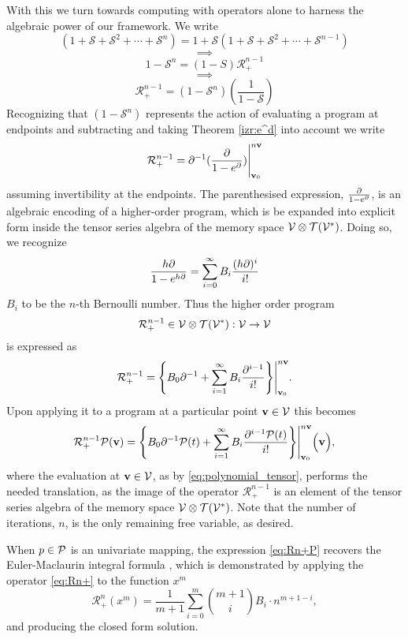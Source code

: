 With this we turn towards computing with operators alone to harness the algebraic power of our framework. We write
$$(1+\mathcal{S}+\mathcal{S}^2+\cdots+\mathcal{S}^n)=1+\mathcal{S}(1+\mathcal{S}+\mathcal{S}^2+\cdots+\mathcal{S}^{n-1})$$
   $$\implies$$
   $$1-\mathcal{S}^n=(1-S)\mathcal{R}^{n-1}_+$$
   $$\implies$$
  \begin{equation}
\mathcal{R}^{n-1}_+=(1-\mathcal{S}^n)(\frac{1}{1-\mathcal{S}})
  \end{equation}
Recognizing that $(1-\mathcal{S}^n)$ represents the action of evaluating a program at endpoints and subtracting and taking Theorem \ref{izr:e^d} into account we write
  \begin{equation}\label{eq:Rn+Basic}
    \mathcal{R}^{n-1}_+=\partial^{-1}(\frac{\partial}{1-e^\partial})\Bigg\vert_{\mathbf{v}_0}^{n\mathbf{v}}
  \end{equation}
assuming invertibility at the endpoints. The parenthesised expression, $\frac{\partial}{1-e^\partial}$, is an algebraic encoding of a higher-order program, which is be expanded into explicit form inside the tensor series algebra of the memory space $\mathcal{V}\otimes \mathcal{T}(\mathcal{V}^*)$. Doing so, we recognize
\begin{equation}
    	\frac{h\partial}{1-e^{h\partial}}=\sum\limits_{i=0}^{\infty}B_i\frac{(h\partial)^i}{i!}
    \end{equation}
$B_i$ to be the $n$-th Bernoulli number. Thus the higher order program
$$\mathcal{R}^{n-1}_+\in \mathcal{V}\otimes \mathcal{T}(\mathcal{V}^*):\mathcal{V}\to\mathcal{V}$$
is expressed as 
    \begin{equation}\label{eq:Rn+}
      \mathcal{R}^{n-1}_+=\Bigg\{B_0\partial^{-1}+\sum\limits_{i=1}^{\infty}B_i\frac{\partial^{i-1}}{i!}\Bigg\}\Bigg\vert_{\mathbf{v}_0}^{n\mathbf{v}}.
    \end{equation}
Upon applying it to a program at a particular point $\mathbf{v}\in \mathcal{V}$ this becomes
\begin{equation}\label{eq:Rn+P}
  \mathcal{R}^{n-1}_+\mathcal{P}(\mathbf{v})=\Bigg\{B_0\partial^{-1}\mathcal{P}(t)+\sum\limits_{i=1}^{\infty}B_i\frac{\partial^{i-1}\mathcal{P}(t)}{i!}\Bigg\}\Bigg\vert_{\mathbf{v}_0}^{n\mathbf{v}} \Big(\mathbf{v}\Big),
    \end{equation}
where the evaluation at $\mathbf{v}\in \mathcal{V}$, as by \eqref{eq:polynomial_tensor}, performs the needed translation, as the image of the operator $\mathcal{R}^{n-1}_+$ is an element of the tensor series algebra of the memory space $\mathcal{V}\otimes \mathcal{T}(\mathcal{V}^*)$.
Note that the number of iterations, $n$, is the only remaining free variable, as desired.
\begin{remark}
  When $p\in\mathcal{P}$ is an univariate mapping, the expression \eqref{eq:Rn+P} recovers the Euler-Maclaurin integral formula \cite{apostol1999elementary}, which is demonstrated by applying the operator \eqref{eq:Rn+} to the function $x^m$
$$\mathcal{R}^n_+(x^m)=\frac{1}{m+1}\sum_{i=0}^m{m+1\choose i}B_i\cdot n^{m+1-i},$$
and producing the closed form solution.
\end{remark}

